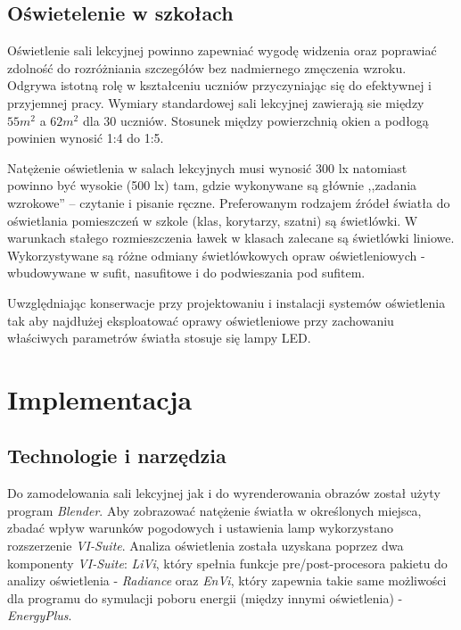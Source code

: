 \documentclass[a4paper,12pt]{article}
\begin{document}
	\subsection{Oświetelenie w szkołach}
	\label{subsec:oswietlenie_w_szkolach}

		Oświetlenie sali lekcyjnej powinno zapewniać wygodę widzenia oraz poprawiać zdolność do rozróżniania szczegółów bez nadmiernego zmęczenia wzroku.  Odgrywa istotną rolę w kształceniu uczniów przyczyniając się do efektywnej i przyjemnej pracy. Wymiary standardowej sali lekcyjnej zawierają sie między $55m^{2}$  a 				$62m^{2}$ dla 30 uczniów. Stosunek między powierzchnią okien a podłogą powinien wynosić 1:4 do 1:5. 

		Natężenie oświetlenia w salach lekcyjnych musi wynosić 300 lx natomiast powinno być wysokie (500 lx) tam, gdzie wykonywane są głównie ,,zadania wzrokowe'' -- czytanie i pisanie ręczne. Preferowanym rodzajem źródeł światła do oświetlania pomieszczeń w szkole (klas, korytarzy, szatni) są świetlówki. W warunkach stałego 				rozmieszczenia ławek w klasach zalecane są świetlówki liniowe. Wykorzystywane są różne odmiany świetlówkowych opraw oświetleniowych - wbudowywane w sufit, nasufitowe i do podwieszania pod sufitem.

		Uwzględniając konserwacje przy projektowaniu i instalacji systemów oświetlenia tak aby najdłużej eksploatować oprawy oświetleniowe przy zachowaniu właściwych parametrów światła stosuje się lampy LED.
	\newpage

	\section{Implementacja}
	 \label{sec:implementacja}

	\subsection{Technologie i narzędzia}
	\label{subsec:technologie_i_narzedzia}

		Do zamodelowania sali lekcyjnej jak i do wyrenderowania obrazów został użyty program \emph{Blender}. Aby zobrazować natężenie światła w określonych miejsca, zbadać wpływ warunków pogodowych i ustawienia lamp wykorzystano rozszerzenie \emph{VI-Suite}. Analiza oświetlenia została uzyskana poprzez dwa 					komponenty \emph{VI-Suite}: \emph{LiVi}, który spełnia funkcje pre/post-procesora pakietu do analizy oświetlenia - \emph{Radiance} oraz \emph{EnVi}, który zapewnia takie same możliwości dla programu do symulacji poboru energii (między innymi oświetlenia) -  \emph{EnergyPlus}.
\end{document}
